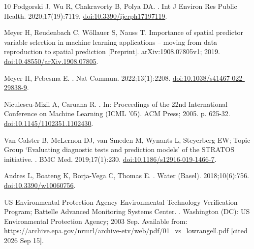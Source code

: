 \documentclass[10pt,letterpaper]{article}
\begin{document}
\begin{thebibliography}{10}
{Podgorski} J, {Wu} R, {Chakravorty} B, {Polya} DA.
.
\newblock Int J Environ Res Public Health. 2020;17(19):7119.
\newblock \href {http://dx.doi.org/10.3390/ijerph17197119}
  {doi:10.3390/ijerph17197119}.

{Meyer} H, {Reudenbach} C, {W{\"o}llauer} S, {Nauss} T. {Importance of spatial
  predictor variable selection in machine learning applications -- moving from
  data reproduction to spatial prediction} [Preprint]. arXiv:1908.07805v1;
  2019.
\newblock \href {http://dx.doi.org/10.48550/arXiv.1908.07805}
  {doi:10.48550/arXiv.1908.07805}.

{Meyer} H, {Pebesma} E.
.
\newblock Nat Commun. 2022;13(1):2208.
\newblock \href {http://dx.doi.org/10.1038/s41467-022-29838-9}
  {doi:10.1038/s41467-022-29838-9}.

{Niculescu-Mizil} A, {Caruana} R.
.
\newblock In: Proceedings of the 22nd International Conference on Machine
  Learning (ICML '05). ACM Press; 2005. p. 625-32.
\newblock \href {http://dx.doi.org/10.1145/1102351.1102430}
  {doi:10.1145/1102351.1102430}.

{Van Calster} B, {McLernon} DJ, {van Smeden} M, {Wynants} L, {Steyerberg} EW;
  {Topic Group `Evaluating diagnostic tests and prediction models' of the
  STRATOS initiative}.
.
\newblock BMC Med. 2019;17(1):230.
\newblock \href {http://dx.doi.org/10.1186/s12916-019-1466-7}
  {doi:10.1186/s12916-019-1466-7}.

{Andres} L, {Boateng} K, {Borja-Vega} C, {Thomas} E.
.
\newblock Water (Basel). 2018;10(6):756.
\newblock \href {http://dx.doi.org/10.3390/w10060756} {doi:10.3390/w10060756}.

{US Environmental Protection Agency Environmental Technology Verification
  Program; Battelle Advanced Monitoring Systems Center}.
.
\newblock Washington (DC): US Environmental Protection Agency; 2003 Sep.
\newblock Available from:
  \url{https://archive.epa.gov/nrmrl/archive-etv/web/pdf/01_vs_lowrangell.pdf}
  [cited 2026 Sep 15].


\end{thebibliography}
\end{document}
